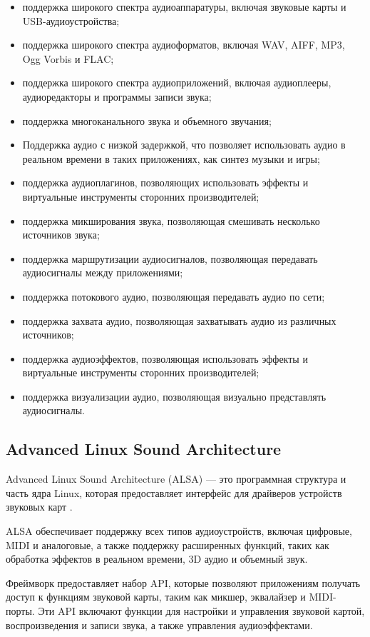 \begin{itemize}
    \item поддержка широкого спектра аудиоаппаратуры, включая звуковые карты и USB-аудиоустройства;
    \item поддержка широкого спектра аудиоформатов, включая WAV, AIFF, MP3, Ogg Vorbis и FLAC;
    \item поддержка широкого спектра аудиоприложений, включая аудиоплееры, аудиоредакторы и программы записи звука;
    \item поддержка многоканального звука и объемного звучания;
    \item Поддержка аудио с низкой задержкой, что позволяет использовать аудио в реальном времени в таких приложениях, как синтез музыки и игры;
    \item поддержка аудиоплагинов, позволяющих использовать эффекты и виртуальные инструменты сторонних производителей;
    \item поддержка микширования звука, позволяющая смешивать несколько источников звука;
    \item поддержка маршрутизации аудиосигналов, позволяющая передавать аудиосигналы между приложениями;
    \item поддержка потокового аудио, позволяющая передавать аудио по сети;
    \item поддержка захвата аудио, позволяющая захватывать аудио из различных источников;
    \item поддержка аудиоэффектов, позволяющая использовать эффекты и виртуальные инструменты сторонних производителей;
    \item поддержка визуализации аудио, позволяющая визуально представлять аудиосигналы.
\end{itemize}

\subsection{Advanced Linux Sound Architecture}

Advanced Linux Sound Architecture (ALSA) --- это программная структура и часть ядра Linux, которая предоставляет интерфейс для драйверов устройств звуковых карт \cite{alsa}.

ALSA обеспечивает поддержку всех типов аудиоустройств, включая цифровые, MIDI и аналоговые, а также поддержку расширенных функций, таких как обработка эффектов в реальном времени, 3D аудио и объемный звук.

Фреймворк предоставляет набор API, которые позволяют приложениям получать доступ к функциям звуковой карты, таким как микшер, эквалайзер и MIDI-порты. Эти API включают функции для настройки и управления звуковой картой, воспроизведения и записи звука, а также управления аудиоэффектами.

